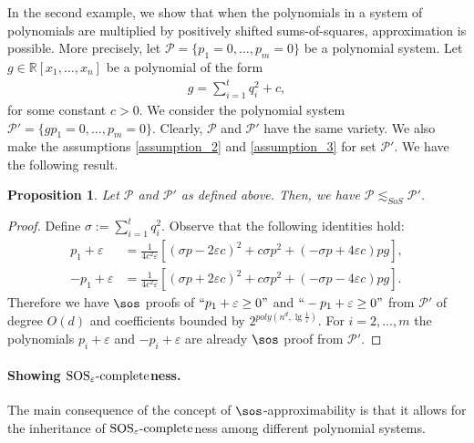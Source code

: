 \documentclass[11pt]{article}
\newtheorem{proposition}[theorem]{Proposition}
\newcommand{\SOSe}{\rm{SOS}_\varepsilon\text{-complete}}
\begin{document}
In the second example, we show that when the polynomials in a system of polynomials are multiplied by positively shifted sums-of-squares, approximation is possible. More precisely, let $\mathcal{P}=\{p_1 = 0, \dots, p_m = 0\}$ be a polynomial system. Let $g\in \mathbb{R}[x_1, \dots, x_n]$ be a polynomial of the form
\begin{align}\label{sos+p}
    g = \sum_{i=1}^t q_i^2 + c,
\end{align}
for some constant $c > 0$. We consider the polynomial system $\mathcal{P}'=\{gp_1=0, \dots, p_m=0\}$. Clearly, $\mathcal{P}$ and $\mathcal{P}'$ have the same variety. We also make the assumptions \ref{assumption_2} and \ref{assumption_3} for set $\mathcal{P}'$. We have the following result.
\begin{proposition}
    Let $\mathcal{P}$ and $\mathcal{P}'$ as defined above. Then, we have $\mathcal{P} \lesssim_{SoS} \mathcal{P}'$.
\end{proposition}
\begin{proof}
Define $\sigma := \sum_{i=1}^t q_i^2$. Observe that the following identities hold: 
\begin{align*}
    p_1 + \varepsilon &= \frac{1}{4c^2 \varepsilon} \left[(\sigma p - 2\varepsilon c)^2 + c \sigma p^2 + (-\sigma p + 4\varepsilon c)pg \right], \\
    -p_1 + \varepsilon &= \frac{1}{4c^2 \varepsilon} \left[(\sigma p + 2\varepsilon c)^2 + c \sigma p^2 + (-\sigma p - 4\varepsilon c)pg \right].
\end{align*}
Therefore we have $\sos$ proofs of $``p_1 + \varepsilon \geq 0"$ and $``-p_1 + \varepsilon \geq 0"$ from $\mathcal{P}'$ of degree $O(d)$ and coefficients bounded by $2^{poly(n^d, \lg \frac{1}{\varepsilon})}$. For $i=2, \dots, m$ the polynomials $p_i+\varepsilon$ and $-p_i+\varepsilon$ are already $\sos$ proof from $\mathcal{P}'$.
\end{proof}

\paragraph{Showing $\SOSe$ness.}

The main consequence of the concept of $\sos$-approximability is that it allows for the inheritance of $\SOSe$ness among different polynomial systems.
\end{document}
